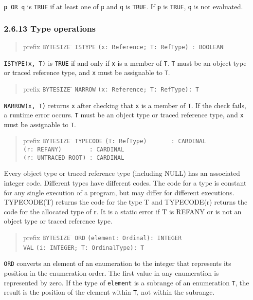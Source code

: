 \documentclass[10pt]{article}
\begin{document}
\verb|p OR q| is \verb|TRUE| if at least one of \verb|p| and \verb|q| is
\verb|TRUE|.  If \verb|p| is \verb|TRUE|, \verb|q| is not evaluated.

\subsubsection*{2.6.13 Type operations}

\begin{quote}
  \begin{tabbing}
    prefix \= \verb|BYTESIZE| \= \kill
           \> \verb|ISTYPE| \> \verb|(x: Reference; T: RefType) : BOOLEAN|
  \end{tabbing}
\end{quote}
\verb|ISTYPE(x, T)| is \verb|TRUE| if and only if \verb|x| is a member of
\verb|T|.  \verb|T| must be an object type or traced reference type, and
\verb|x| must be assignable to \verb|T|.
\begin{quote}
  \begin{tabbing}
    prefix \= \verb|BYTESIZE| \= \kill
           \> \verb|NARROW| \> \verb|(x: Reference; T: RefType): T|
  \end{tabbing}
\end{quote}
\verb|NARROW(x, T)| returns \verb|x| after checking that \verb|x| is a member
of \verb|T|.  If the check fails, a runtime error occurs.  \verb|T| must be an
object type or traced reference type, and \verb|x| must be assignable to
\verb|T|.

\begin{quote}
  \begin{tabbing}
    prefix \= \verb|BYTESIZE| \= \kill
           \> \verb|TYPECODE| \> \verb|(T: RefType)       : CARDINAL| \\
           \>                 \> \verb|(r: REFANY)        : CARDINAL| \\
           \>                 \> \verb|(r: UNTRACED ROOT) : CARDINAL|
  \end{tabbing}
\end{quote}
Every object type or traced reference type (including NULL) has an associated
integer code.  Different types have different codes.  The code for a type is
constant for any single execution of a program, but may differ for different
executions.  TYPECODE(T) returns the code for the type T and TYPECODE(r)
returns the code for the allocated type of r.  It is a static error if T is
REFANY or is not an object type or traced reference type.

\begin{quote}
  \begin{tabbing}
    prefix \= \verb|BYTESIZE| \= \kill
           \> \verb|ORD| \> \verb|(element: Ordinal): INTEGER| \\
           \> \verb|VAL| \> \verb|(i: INTEGER; T: OrdinalType): T|
  \end{tabbing}
\end{quote}
\verb|ORD| converts an element of an enumeration to the integer that
represents its position in the enumeration order.  The first value in any
enumeration is represented by zero.  If the type of \verb|element| is a
subrange of an enumeration \verb|T|, the result is the position of the element
within \verb|T|, not within the subrange.
\end{document}
